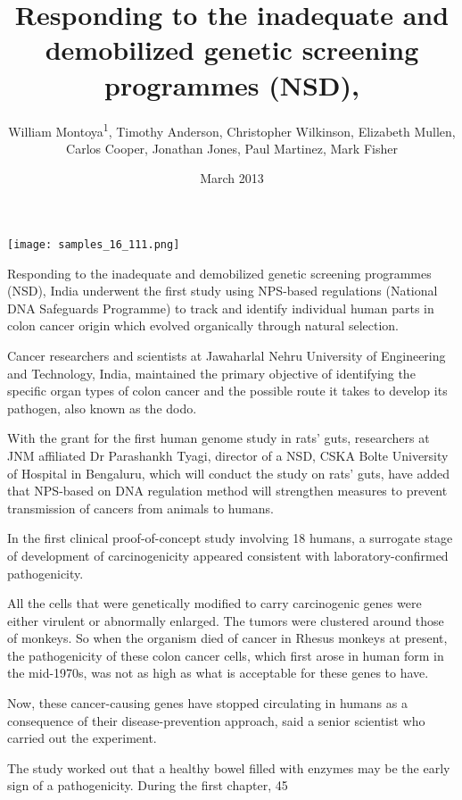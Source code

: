 \documentclass{article}
\title{Responding to the inadequate and demobilized genetic screening programmes (NSD),}
\author{William Montoya\textsuperscript{1},  Timothy Anderson,  Christopher Wilkinson,  Elizabeth Mullen,  Carlos Cooper,  Jonathan Jones,  Paul Martinez,  Mark Fisher}
\affil{\textsuperscript{1}Northeastern University}
\date{March 2013}
\begin{document}
\maketitle

\begin{center}
\begin{minipage}{0.75\linewidth}
\texttt{[image: samples\_16\_111.png]}
\end{minipage}
\end{center}

Responding to the inadequate and demobilized genetic screening programmes (NSD), India underwent the first study using NPS-based regulations (National DNA Safeguards Programme) to track and identify individual human parts in colon cancer origin which evolved organically through natural selection.

Cancer researchers and scientists at Jawaharlal Nehru University of Engineering and Technology, India, maintained the primary objective of identifying the specific organ types of colon cancer and the possible route it takes to develop its pathogen, also known as the dodo.

With the grant for the first human genome study in rats’ guts, researchers at JNM affiliated Dr Parashankh Tyagi, director of a NSD, CSKA Bolte University of Hospital in Bengaluru, which will conduct the study on rats’ guts, have added that NPS-based on DNA regulation method will strengthen measures to prevent transmission of cancers from animals to humans.

In the first clinical proof-of-concept study involving 18 humans, a surrogate stage of development of carcinogenicity appeared consistent with laboratory-confirmed pathogenicity.

All the cells that were genetically modified to carry carcinogenic genes were either virulent or abnormally enlarged. The tumors were clustered around those of monkeys. So when the organism died of cancer in Rhesus monkeys at present, the pathogenicity of these colon cancer cells, which first arose in human form in the mid-1970s, was not as high as what is acceptable for these genes to have.

Now, these cancer-causing genes have stopped circulating in humans as a consequence of their disease-prevention approach, said a senior scientist who carried out the experiment.

The study worked out that a healthy bowel filled with enzymes may be the early sign of a pathogenicity. During the first chapter, 45%
\end{document}
